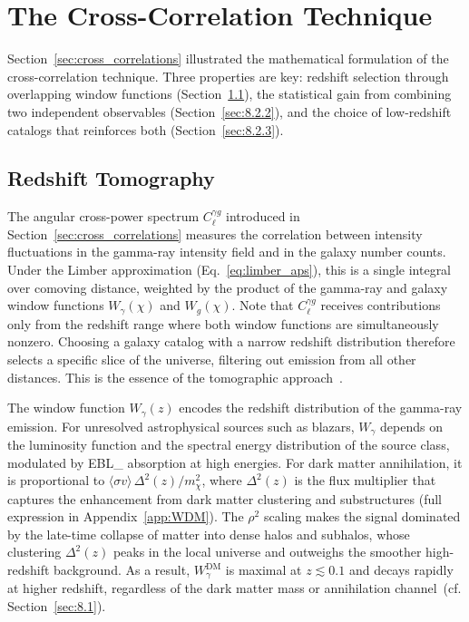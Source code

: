 
\section{The Cross-Correlation Technique}
\label{sec:8.2}
Section~\ref{sec:cross_correlations} illustrated the mathematical formulation of the cross-correlation technique. 
Three properties are key: redshift selection through overlapping window functions (Section~\ref{sec:8.2.1}), the statistical gain from combining two independent observables (Section~\ref{sec:8.2.2}), and the choice of low-redshift catalogs that reinforces both (Section~\ref{sec:8.2.3}).

\subsection{Redshift Tomography}
\label{sec:8.2.1}

The angular cross-power spectrum $C_\ell^{\gamma g}$ introduced in Section~\ref{sec:cross_correlations} measures the correlation between intensity fluctuations in the gamma-ray intensity field and in the galaxy number counts.
Under the Limber approximation (Eq.~\ref{eq:limber_aps}), this is a single integral over comoving distance, weighted by the product of the gamma-ray and galaxy window functions $W_\gamma(\chi)$ and $W_g(\chi)$.
Note that $C_\ell^{\gamma g}$ receives contributions only from the redshift range where both window functions are simultaneously nonzero.
Choosing a galaxy catalog with a narrow redshift distribution therefore selects a specific slice of the universe, filtering out emission from all other distances.
This is the essence of the tomographic approach~\cite{xia2015tomography,DGRB-review}.

The window function $W_\gamma(z)$ encodes the redshift distribution of the gamma-ray emission.
For unresolved astrophysical sources such as blazars, $W_\gamma$ depends on the luminosity function and the spectral energy distribution of the source class, modulated by \gls{EBL_} absorption at high energies.
For dark matter annihilation, it is proportional to $\langle\sigma v\rangle\,\Delta^2(z)/m_\chi^2$, where $\Delta^2(z)$ is the flux multiplier that captures the enhancement from dark matter clustering and substructures (full expression in Appendix~\ref{app:WDM}).
The $\rho^2$ scaling makes the signal dominated by the late-time collapse of matter into dense halos and subhalos, whose clustering $\Delta^2(z)$ peaks in the local universe and outweighs the smoother high-redshift background.
As a result, $W_\gamma^\mathrm{DM}$ is maximal at $z \lesssim 0.1$ and decays rapidly at higher redshift, regardless of the dark matter mass or annihilation channel~(cf. Section~\ref{sec:8.1}).

